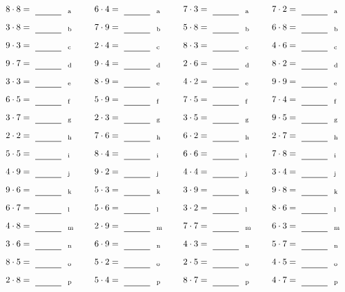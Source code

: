 \documentclass
[
  draft    = true,
  fontsize = 11pt,
  parskip  = half-
]
{scrartcl}
\begin{document}
\par\vfill\par
\begin{align*}
    \pline{8\cdot8}&=\rline{a}
  & \pline{6\cdot4}&=\rline{a}
  & \pline{7\cdot3}&=\rline{a}
  & \pline{7\cdot2}&=\rline{a} \\[1ex]
    \pline{3\cdot8}&=\rline{b}
  & \pline{7\cdot9}&=\rline{b}
  & \pline{5\cdot8}&=\rline{b}
  & \pline{6\cdot8}&=\rline{b} \\[1ex]
    \pline{9\cdot3}&=\rline{c}
  & \pline{2\cdot4}&=\rline{c}
  & \pline{8\cdot3}&=\rline{c}
  & \pline{4\cdot6}&=\rline{c} \\[1ex]
    \pline{9\cdot7}&=\rline{d}
  & \pline{9\cdot4}&=\rline{d}
  & \pline{2\cdot6}&=\rline{d}
  & \pline{8\cdot2}&=\rline{d} \\[1ex]
    \pline{3\cdot3}&=\rline{e}
  & \pline{8\cdot9}&=\rline{e}
  & \pline{4\cdot2}&=\rline{e}
  & \pline{9\cdot9}&=\rline{e} \\[1ex]
    \pline{6\cdot5}&=\rline{f}
  & \pline{5\cdot9}&=\rline{f}
  & \pline{7\cdot5}&=\rline{f}
  & \pline{7\cdot4}&=\rline{f} \\[1ex]
    \pline{3\cdot7}&=\rline{g}
  & \pline{2\cdot3}&=\rline{g}
  & \pline{3\cdot5}&=\rline{g}
  & \pline{9\cdot5}&=\rline{g} \\[1ex]
    \pline{2\cdot2}&=\rline{h}
  & \pline{7\cdot6}&=\rline{h}
  & \pline{6\cdot2}&=\rline{h}
  & \pline{2\cdot7}&=\rline{h} \\[1ex]
    \pline{5\cdot5}&=\rline{i}
  & \pline{8\cdot4}&=\rline{i}
  & \pline{6\cdot6}&=\rline{i}
  & \pline{7\cdot8}&=\rline{i} \\[1ex]
    \pline{4\cdot9}&=\rline{j}
  & \pline{9\cdot2}&=\rline{j}
  & \pline{4\cdot4}&=\rline{j}
  & \pline{3\cdot4}&=\rline{j} \\[1ex]
    \pline{9\cdot6}&=\rline{k}
  & \pline{5\cdot3}&=\rline{k}
  & \pline{3\cdot9}&=\rline{k}
  & \pline{9\cdot8}&=\rline{k} \\[1ex]
    \pline{6\cdot7}&=\rline{l}
  & \pline{5\cdot6}&=\rline{l}
  & \pline{3\cdot2}&=\rline{l}
  & \pline{8\cdot6}&=\rline{l} \\[1ex]
    \pline{4\cdot8}&=\rline{m}
  & \pline{2\cdot9}&=\rline{m}
  & \pline{7\cdot7}&=\rline{m}
  & \pline{6\cdot3}&=\rline{m} \\[1ex]
    \pline{3\cdot6}&=\rline{n}
  & \pline{6\cdot9}&=\rline{n}
  & \pline{4\cdot3}&=\rline{n}
  & \pline{5\cdot7}&=\rline{n} \\[1ex]
    \pline{8\cdot5}&=\rline{o}
  & \pline{5\cdot2}&=\rline{o}
  & \pline{2\cdot5}&=\rline{o}
  & \pline{4\cdot5}&=\rline{o} \\[1ex]
    \pline{2\cdot8}&=\rline{p}
  & \pline{5\cdot4}&=\rline{p}
  & \pline{8\cdot7}&=\rline{p}
  & \pline{4\cdot7}&=\rline{p}
\end{align*}
\end{document}
